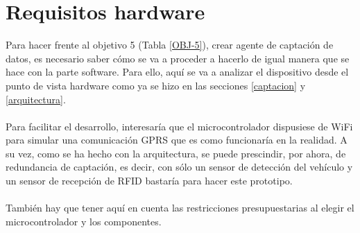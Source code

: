 \section{Requisitos hardware} \label{requisito-hw}
Para hacer frente al objetivo 5 (Tabla \ref{OBJ-5}), crear agente de captación de datos, es necesario saber cómo se va a proceder a hacerlo de igual manera que se hace con la parte software. Para ello, aquí se va a analizar el dispositivo desde el punto de vista hardware como ya se hizo en las secciones \ref{captacion} y \ref{arquitectura}.
\\\\
Para facilitar el desarrollo, interesaría que el microcontrolador dispusiese de WiFi para simular una comunicación GPRS que es como funcionaría en la realidad. A su vez, como se ha hecho con la arquitectura, se puede prescindir, por ahora, de redundancia de captación, es decir, con sólo un sensor de detección del vehículo y un sensor de recepción de RFID bastaría para hacer este prototipo.
\\\\
También hay que tener aquí en cuenta las restricciones presupuestarias al elegir el microcontrolador y los componentes. 

